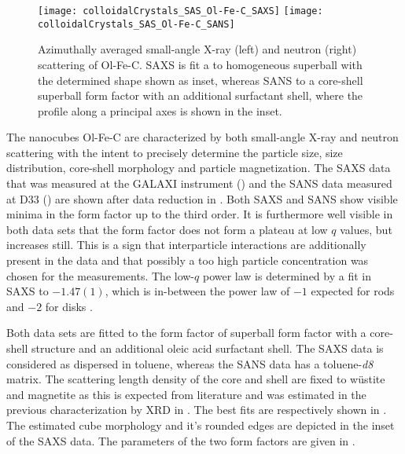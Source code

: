\documentclass[\main/dresen_thesis.tex]{subfiles}
\begin{document}
  \label{sec:colloidalCrystals:nanoparticle:sas}

  \begin{figure}[htbp]
    \centering
    \texttt{[image: colloidalCrystals\_SAS\_Ol-Fe-C\_SAXS]}
    \texttt{[image: colloidalCrystals\_SAS\_Ol-Fe-C\_SANS]}
    \caption{\label{fig:colloidalCrystals:nanoparticle:sas}Azimuthally averaged small-angle X-ray (left) and neutron (right) scattering of Ol-Fe-C. SAXS is fit a to homogeneous superball with the determined shape shown as inset, whereas SANS to a core-shell superball form factor with an additional surfactant shell, where the profile along a principal axes is shown in the inset.}
  \end{figure}
  The nanocubes Ol-Fe-C are characterized by both small-angle X-ray and neutron scattering with the intent to precisely determine the particle size, size distribution, core-shell morphology and particle magnetization.
  The SAXS data that was measured at the GALAXI instrument () and the SANS data measured at D33 () are shown after data reduction in .
  Both SAXS and SANS show visible minima in the form factor up to the third order.
  It is furthermore well visible in both data sets that the form factor does not form a plateau at low $q$ values, but increases still.
  This is a sign that interparticle interactions are additionally present in the data and that possibly a too high particle concentration was chosen for the measurements.
  The low-$q$ power law is determined by a fit in SAXS to $-1.47(1)$, which is in-between the power law of $-1$ expected for rods and $-2$ for disks \cite{Guinier_1955_Smalla}.

  Both data sets are fitted to the form factor of superball form factor with a core-shell structure and an additional oleic acid surfactant shell.
  The SAXS data is considered as dispersed in toluene, whereas the SANS data has a toluene-\textit{d8} matrix.
  The scattering length density of the core and shell are fixed to w\"ustite and magnetite as this is expected from literature \cite{Wetterskog_2013_Anoma} and was estimated in the previous characterization by XRD in .
  The best fits are respectively shown in .
  The estimated cube morphology and it's rounded edges are depicted in the inset of the SAXS data.
  The parameters of the two form factors are given in .
\end{document}
